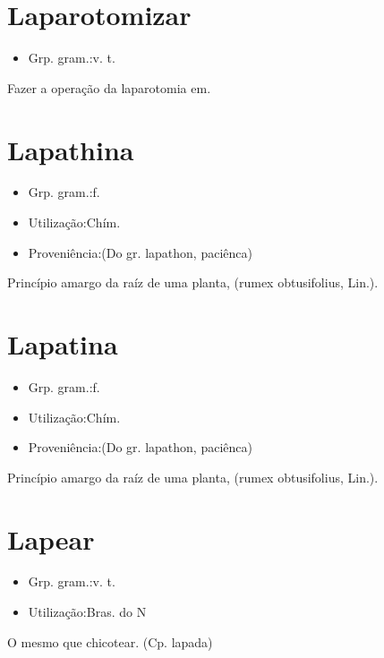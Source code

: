 \section{Laparotomizar}
\begin{itemize}
\item {Grp. gram.:v. t.}
\end{itemize}
Fazer a operação da laparotomia em.
\section{Lapathina}
\begin{itemize}
\item {Grp. gram.:f.}
\end{itemize}
\begin{itemize}
\item {Utilização:Chím.}
\end{itemize}
\begin{itemize}
\item {Proveniência:(Do gr. \textunderscore lapathon\textunderscore , paciênca)}
\end{itemize}
Princípio amargo da raíz de uma planta, (\textunderscore rumex obtusifolius\textunderscore , Lin.).
\section{Lapatina}
\begin{itemize}
\item {Grp. gram.:f.}
\end{itemize}
\begin{itemize}
\item {Utilização:Chím.}
\end{itemize}
\begin{itemize}
\item {Proveniência:(Do gr. \textunderscore lapathon\textunderscore , paciênca)}
\end{itemize}
Princípio amargo da raíz de uma planta, (\textunderscore rumex obtusifolius\textunderscore , Lin.).
\section{Lapear}
\begin{itemize}
\item {Grp. gram.:v. t.}
\end{itemize}
\begin{itemize}
\item {Utilização:Bras. do N}
\end{itemize}
O mesmo que \textunderscore chicotear\textunderscore .
(Cp. \textunderscore lapada\textunderscore )
